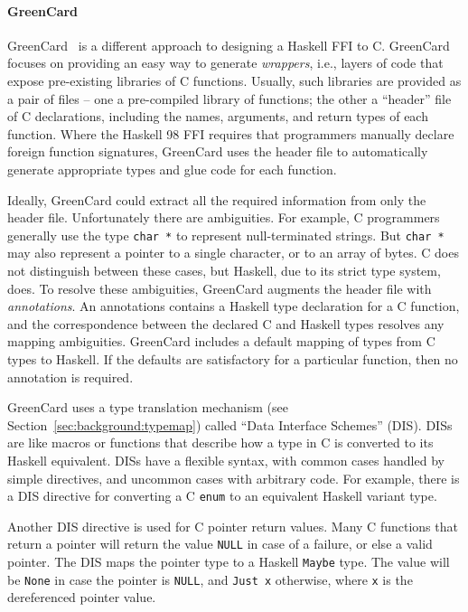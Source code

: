 \paragraph{GreenCard}

GreenCard~\cite{jones97greencard} is a different approach to designing a Haskell FFI to C. GreenCard focuses on providing an easy way to generate \emph{wrappers}, i.e., layers of code that expose pre-existing libraries of C functions. Usually, such libraries are provided as a pair of files -- one a pre-compiled library of functions; the other a ``header'' file of C declarations, including the names, arguments, and return types of each function. Where the Haskell 98 FFI requires that programmers manually declare foreign function signatures, GreenCard uses the header file to automatically generate appropriate types and glue code for each function.

Ideally, GreenCard could extract all the required information from only the header file. Unfortunately there are ambiguities. For example, C programmers generally use the type \texttt{char *} to represent null-terminated strings. But \texttt{char *} may also represent a pointer to a single character, or to an array of bytes. C does not distinguish between these cases, but Haskell, due to its strict type system, does. To resolve these ambiguities, GreenCard augments the header file with \emph{annotations}. An annotations contains a Haskell type declaration for a C function, and the correspondence between the declared C and Haskell types resolves any mapping ambiguities. GreenCard includes a default mapping of types from C types to Haskell. If the defaults are satisfactory for a particular function, then no annotation is required.

GreenCard uses a type translation mechanism (see Section~\ref{sec:background:typemap}) called ``Data Interface Schemes'' (DIS). DISs are like macros or functions that describe how a type in C is converted to its Haskell equivalent. DISs have a flexible syntax, with common cases handled by simple directives, and uncommon cases with arbitrary code. For example, there is a DIS directive for converting a C \texttt{enum} to an equivalent Haskell variant type.

Another DIS directive is used for C pointer return values. Many C functions that return a pointer will return the value \texttt{NULL} in case of a failure, or else a valid pointer. The DIS maps the pointer type to a Haskell \texttt{Maybe} type. The value will be \texttt{None} in case the pointer is \texttt{NULL}, and \texttt{Just x} otherwise, where \texttt{x} is the dereferenced pointer value.

